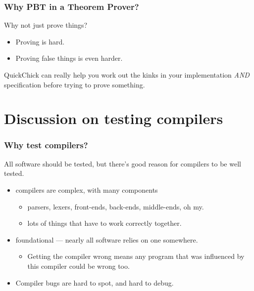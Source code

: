 \documentclass{beamer}
\begin{document}
\begin{frame}
  \frametitle{Why PBT in a Theorem Prover?}

  Why not just prove things?

  \begin{itemize}
  \item Proving is hard.
    \pause
  \item Proving false things is even harder.
  \end{itemize}

  QuickChick can really help you work out the kinks in your
  implementation \emph{AND} specification before trying to prove something.
\end{frame}

\section{Discussion on testing compilers}

\begin{frame}
  \frametitle{Why test compilers?}

  All software should be tested, but there's good reason for compilers
  to be well tested.

  \begin{itemize}
  \item compilers are complex, with many components
          \begin{itemize}
          \item parsers, lexers, front-ends, back-ends, middle-ends, oh my.
          \item lots of things that have to work correctly together.
          \end{itemize}
  \item foundational --- nearly all software relies on one somewhere.
    \begin{itemize}
    \item Getting the compiler wrong means any program that was
      influenced by this compiler could be wrong too.
    \end{itemize}
  \item Compiler bugs are hard to spot, and hard to debug.
  \end{itemize}
\end{frame}


  
\end{document}
